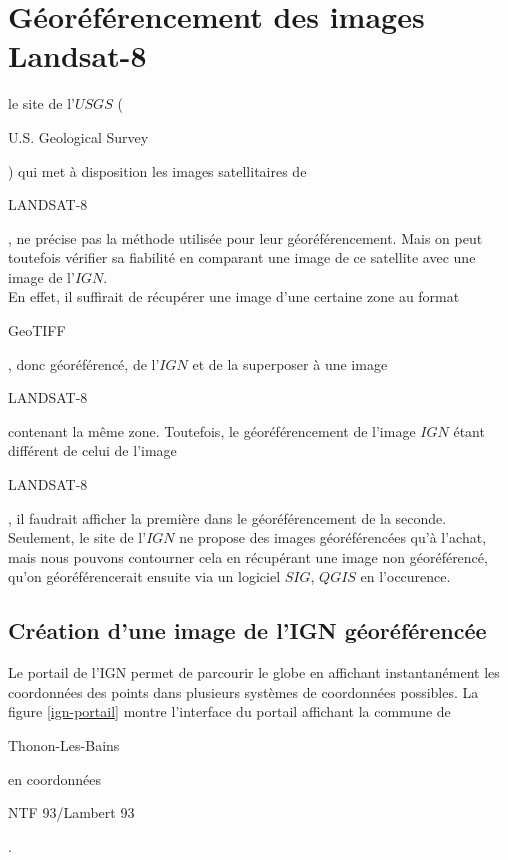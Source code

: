 \documentclass{book}
\begin{document}
\section{Géoréférencement des images Landsat-8}

le site de l'$USGS$ (\begin{itshape}U.S. Geological Survey\end{itshape}) \cite{landsat8} qui met à disposition les images
satellitaires de \begin{itshape}LANDSAT-8\end{itshape}, ne précise pas la méthode utilisée pour leur géoréférencement.
Mais on peut toutefois vérifier sa fiabilité en comparant une image de ce satellite avec une image de 
l'$IGN$.\\
En effet, il suffirait de récupérer une image d'une certaine zone au format \begin{itshape}GeoTIFF\end{itshape}, 
donc géoréférencé, de l'$IGN$ et de la superposer
à une image \begin{itshape}LANDSAT-8\end{itshape} contenant la même zone. Toutefois, le géoréférencement de l'image $IGN$ étant différent
de celui de l'image \begin{itshape}LANDSAT-8\end{itshape}, il faudrait afficher la première dans le géoréférencement de la seconde.\\
Seulement, le site de l'$IGN$ ne propose des images géoréférencées qu'à l'achat, mais nous pouvons contourner cela en récupérant une 
image non géoréférencé, qu'on géoréférencerait ensuite via un logiciel $SIG$, $QGIS$ en l'occurence.\\

\subsection{Création d'une image de l'IGN géoréférencée}

Le portail de l'IGN \cite{ign-portail} permet de parcourir le globe en affichant instantanément les coordonnées des points dans 
plusieurs systèmes de coordonnées possibles. La figure \ref{ign-portail} montre l'interface du portail affichant la commune de
\begin{itshape}Thonon-Les-Bains\end{itshape} en coordonnées \begin{itshape}NTF 93/Lambert 93\end{itshape}.
\end{document}

